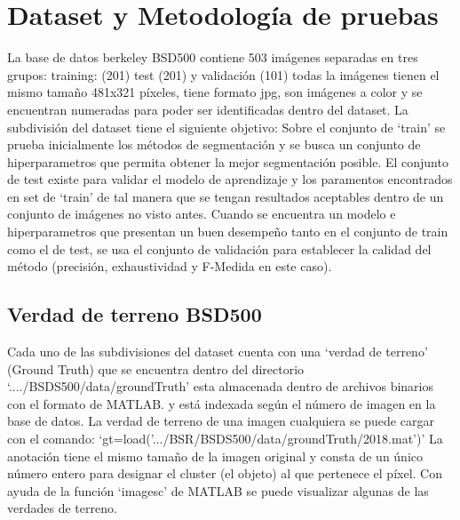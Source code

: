 \documentclass[10pt,twocolumn,letterpaper]{article}
\begin{document}
\section{Dataset y Metodología de pruebas}

La base de datos berkeley BSD500 contiene 503 imágenes  separadas en tres  grupos: training: (201) test (201) y validación (101) todas la imágenes tienen el mismo tamaño 481x321 píxeles, tiene formato jpg, son imágenes a color y se encuentran numeradas para poder ser identificadas dentro del dataset.
La subdivisión del dataset tiene el siguiente objetivo: Sobre el conjunto de ‘train’ se prueba inicialmente los métodos de segmentación y se busca un conjunto de  hiperparametros que permita obtener la mejor segmentación posible. El conjunto de test existe para validar el modelo de aprendizaje y los paramentos encontrados en set de ‘train’ de tal manera que se tengan resultados aceptables dentro de un conjunto de imágenes no visto antes. Cuando se encuentra un modelo e hiperparametros que presentan un buen desempeño tanto en el conjunto de train como el de test, se usa el conjunto de validación para establecer la calidad del método (precisión, exhaustividad y F-Medida en este caso).

\subsection{Verdad de terreno BSD500}

Cada uno de las subdivisiones del dataset cuenta con una ‘verdad de terreno’ (Ground Truth) que se encuentra dentro del directorio ‘..../BSDS500/data/groundTruth’ esta almacenada dentro de archivos binarios con el formato de MATLAB. y está indexada según el número de imagen en la base de datos.  La verdad de terreno de una imagen cualquiera se puede cargar con el comando:
‘gt=load('.../BSR/BSDS500/data/groundTruth/2018.mat')’
La anotación tiene el mismo tamaño de la imagen original y consta de un único número entero para designar el cluster (el objeto) al que pertenece el píxel. Con ayuda de la función ‘imagesc’ de MATLAB se puede visualizar algunas de las verdades de terreno.
\end{document}
